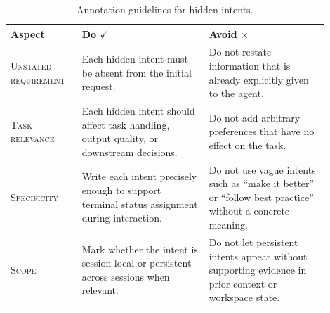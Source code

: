 \begin{table}[tb]
\centering
\caption{Annotation guidelines for hidden intents.}
\label{tab:annotation_hidden_intents}
\small
\begin{tabular}{p{0.20\linewidth}p{0.36\linewidth}p{0.34\linewidth}}
\toprule[1.25pt]
\textbf{Aspect} & \textbf{Do} $\checkmark$ & \textbf{Avoid} $\times$ \\
\midrule[0.75pt]
\textsc{Unstated requirement} &
Each hidden intent must be absent from the initial request. &
Do not restate information that is already explicitly given to the agent. \\
\midrule[0.75pt]
\textsc{Task relevance} &
Each hidden intent should affect task handling, output quality, or downstream decisions. &
Do not add arbitrary preferences that have no effect on the task. \\
\midrule[0.75pt]
\textsc{Specificity} &
Write each intent precisely enough to support terminal status assignment during interaction. &
Do not use vague intents such as ``make it better'' or ``follow best practice'' without a concrete meaning. \\
\midrule[0.75pt]
\textsc{Scope} &
Mark whether the intent is session-local or persistent across sessions when relevant. &
Do not let persistent intents appear without supporting evidence in prior context or workspace state. \\
\bottomrule[1.25pt]
\end{tabular}
\end{table}